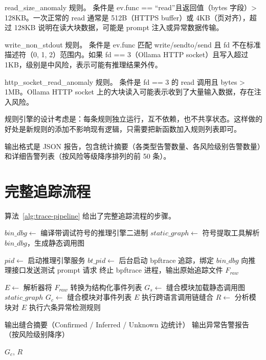 read\_size\_anomaly 规则。 条件是 ev.func == “read”且返回值（bytes 字段）> 128KB。一次正常的 read 通常是 512B（HTTPS buffer）或 4KB（页对齐），超过 128KB 说明在读大块数据，可能是 prompt 注入或异常数据传输。

write\_non\_stdout 规则。 条件是 ev.func 匹配 write/sendto/send 且 fd 不在标准描述符（0, 1, 2）范围内。如果 fd == 3（Ollama HTTP socket）且写入超过 1KB，级别是中风险，表示可能有推理结果外传。

http\_socket\_read\_anomaly 规则。 条件是 fd == 3 的 read 调用且 bytes > 1MB。Ollama HTTP socket 上的大块读入可能表示收到了大量输入数据，存在注入风险。

规则引擎的设计考虑是：每条规则独立运行，互不依赖，也不共享状态。这样做的好处是新规则的添加不影响现有逻辑，只需要把新函数加入规则列表即可。

输出格式是 JSON 报告，包含统计摘要（各类型告警数量、各风险级别告警数量）和详细告警列表（按风险等级降序排列的前 50 条）。

\section{完整追踪流程}

算法~\ref{alg:trace-pipeline} 给出了完整追踪流程的步骤。

\begin{algorithm}[H]
\caption{追踪流程算法}
\label{alg:trace-pipeline}

\BlankLine
{}
$bin\_dbg \leftarrow$ 编译带调试符号的推理引擎二进制\;
$static\_graph \leftarrow$ 符号提取工具解析 $bin\_dbg$，生成静态调用图\;

\BlankLine
{}
$pid \leftarrow$ 启动推理引擎服务\;
$bt\_pid \leftarrow$ 后台启动 bpftrace 追踪，绑定 $bin\_dbg$\;
向推理接口发送测试 prompt 请求\;
终止 bpftrace 进程，输出原始追踪文件 $F_{raw}$\;

\BlankLine
{}
$E \leftarrow$ 解析器将 $F_{raw}$ 转换为结构化事件列表\;
$G_s \leftarrow$ 缝合模块加载静态调用图 $static\_graph$\;
$G_c \leftarrow$ 缝合模块对事件列表 $E$ 执行跨语言调用链缝合\;
$R \leftarrow$ 分析模块对 $E$ 执行六条异常检测规则\;

\BlankLine
{}
输出缝合摘要（Confirmed / Inferred / Unknown 边统计）\;
输出异常告警报告（按风险级别降序）\;

\Return $G_c$, $R$
\end{algorithm}

